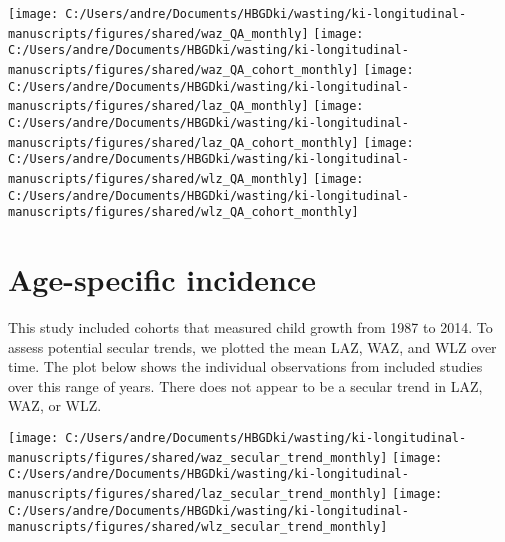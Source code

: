 \documentclass[
  9pt,
]{book}
\begin{document}
\texttt{[image: C:/Users/andre/Documents/HBGDki/wasting/ki-longitudinal-manuscripts/figures/shared/waz\_QA\_monthly]}
\texttt{[image: C:/Users/andre/Documents/HBGDki/wasting/ki-longitudinal-manuscripts/figures/shared/waz\_QA\_cohort\_monthly]}
\texttt{[image: C:/Users/andre/Documents/HBGDki/wasting/ki-longitudinal-manuscripts/figures/shared/laz\_QA\_monthly]}
\texttt{[image: C:/Users/andre/Documents/HBGDki/wasting/ki-longitudinal-manuscripts/figures/shared/laz\_QA\_cohort\_monthly]}
\texttt{[image: C:/Users/andre/Documents/HBGDki/wasting/ki-longitudinal-manuscripts/figures/shared/wlz\_QA\_monthly]}
\texttt{[image: C:/Users/andre/Documents/HBGDki/wasting/ki-longitudinal-manuscripts/figures/shared/wlz\_QA\_cohort\_monthly]}

\hypertarget{age-specific-incidence-2}{%
\section{Age-specific incidence}\label{age-specific-incidence-2}}

This study included cohorts that measured child growth from 1987 to 2014. To assess potential secular trends, we plotted the mean LAZ, WAZ, and WLZ over time. The plot below shows the individual observations from included studies over this range of years. There does not appear to be a secular trend in LAZ, WAZ, or WLZ.

\texttt{[image: C:/Users/andre/Documents/HBGDki/wasting/ki-longitudinal-manuscripts/figures/shared/waz\_secular\_trend\_monthly]}
\texttt{[image: C:/Users/andre/Documents/HBGDki/wasting/ki-longitudinal-manuscripts/figures/shared/laz\_secular\_trend\_monthly]}
\texttt{[image: C:/Users/andre/Documents/HBGDki/wasting/ki-longitudinal-manuscripts/figures/shared/wlz\_secular\_trend\_monthly]}

  
\end{document}
